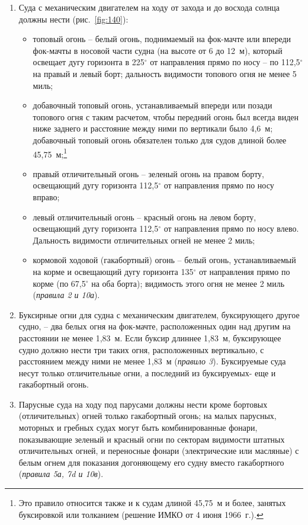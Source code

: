 \documentclass[a4paper, 12pt, twoside, final]{scrbook}
\begin{document}
\begin{enumerate}
\item Суда с механическим двигателем на ходу от захода и до восхода солнца должны нести (рис.~\ref{fig:140}):

\begin{itemize}
\item топовый огонь \--- белый огонь, поднимаемый на фок-мачте или впереди фок-мачты в носовой части судна (на высоте от 6 до 12~м), который освещает дугу горизонта в 225$^\circ$ от направления прямо по носу \--- по 112,5$^\circ$ на правый и левый борт; дальность видимости топового огня не менее 5 миль;
\item добавочный топовый огонь, устанавливаемый впереди или позади топового огня с таким расчетом, чтобы передний огонь был всегда виден ниже заднего и расстояние между ними по вертикали было 4,6~м; добавочный топовый огонь обязателен только для судов длиной более 45,75~м;\footnote{Это правило относится также и к судам длиной 45,75~м и более, занятых буксировкой или толканием (решение ИМКО от 4 июня 1966~г.).}
\item правый отличительный огонь \--- зеленый огонь на правом борту, освещающий дугу горизонта 112,5$^\circ$ от направления прямо по носу вправо;
\item левый отличительный огонь \--- красный огонь на левом борту, освещающий дугу горизонта 112,5$^\circ$ от направления прямо по носу влево. Дальность видимости отличительных огней не менее 2 миль;
\item кормовой ходовой (гакабортный) огонь \--- белый огонь, устанавливаемый на корме и освещающий дугу горизонта 135$^\circ$ от направления прямо по корме (по 67,5$^\circ$ на оба борта); видимость этого огня не менее 2 миль (\textit{правила 2 и 10а}).
\end{itemize}

\item Буксирные огни для судна с механическим двигателем, буксирующего другое судно, \--- два белых огня на фок-мачте, расположенных один над другим на расстоянии не менее 1,83~м. Если буксир длиннее 1,83~м, буксирующее судно должно нести три таких огня, расположенных вертикально, с расстоянием между ними не менее 1,83~м (\textit{правило 3}).
Буксируемые суда несут только отличительные огни, а последний из буксируемых- еще и гакабортный огонь.

\item Парусные суда на ходу под парусами должны нести кроме бортовых (отличительных) огней только гакабортный огонь; на малых парусных, моторных и гребных судах могут быть комбинированные фонари, показывающие зеленый и красный огни по секторам видимости штатных отличительных огней, и переносные фонари (электрические или масляные) с белым огнем для показания догоняющему его судну вместо гакабортного (\textit{правила 5а, 7d и 10в}).


\end{enumerate}
\end{document}
